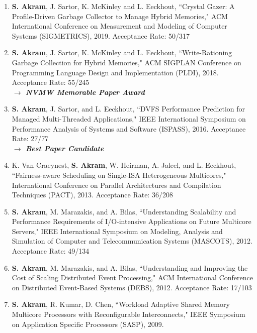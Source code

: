 \documentclass[singlecolumn,singlespace,11pt]{article}
\begin{document}
\begin{enumerate}
\item 
\textbf{S. Akram}, J. Sartor, K. McKinley and L. Eeckhout, ``Crystal Gazer: A Profile-Driven Garbage 
Collector to Manage Hybrid Memories," ACM International Conference on Measurement and Modeling of Computer Systems
(SIGMETRICS), 2019. {\color{blue} Acceptance Rate: 50/317}

\item
\textbf{S. Akram}, J. Sartor, K. McKinley and L. Eeckhout, ``Write-Rationing Garbage Collection for Hybrid Memories," ACM SIGPLAN Conference on Programming Language Design and Implementation (PLDI), 2018. {\color{blue} Acceptance Rate: 55/245}
\\
{\color{BrickRed} \textbf{$\longrightarrow$ \emph{NVMW Memorable Paper Award}}}

\item
\textbf{S. Akram}, J. Sartor, and L. Eeckhout, ``DVFS Performance Prediction for Managed Multi-Threaded Applications," IEEE International Symposium on Performance Analysis 
of Systems and Software (ISPASS), 2016. {\color{blue} Acceptance Rate: 27/77} 
\\
{\color{BrickRed} \textbf{$\longrightarrow$ \emph{Best Paper Candidate}}}

\item
K. Van Craeynest, \textbf{S. Akram}, W. Heirman, A. Jaleel, and L. Eeckhout, ``Fairness-aware Scheduling on Single-ISA Heterogeneous Multicores," 
International Conference on Parallel Architectures and Compilation Techniques (PACT), 2013. {\color{blue} Acceptance Rate: 36/208}

\item
\textbf{S. Akram}, M. Marazakis, and A. Bilas, ``Understanding Scalability and Performance Requirements of I/O-intensive Applications
on Future Multicore Servers," IEEE International Symposium on Modeling, Analysis and Simulation of Computer and 
Telecommunication Systems (MASCOTS), 2012. {\color{blue} Acceptance Rate: 49/134}

\item 
\textbf{S. Akram}, M. Marazakis, and A. Bilas, ``Understanding and Improving the Cost of Scaling Distributed Event Processing," 
ACM International Conference on Distributed Event-Based Systems (DEBS), 2012. {\color{blue} Acceptance Rate: 17/103}

\item
\textbf{S. Akram}, R. Kumar, D. Chen, ``Workload Adaptive Shared Memory Multicore Processors with Reconfigurable Interconnects,"
IEEE Symposium on Application Specific Processors (SASP), 2009. 


\end{enumerate}
\end{document}
